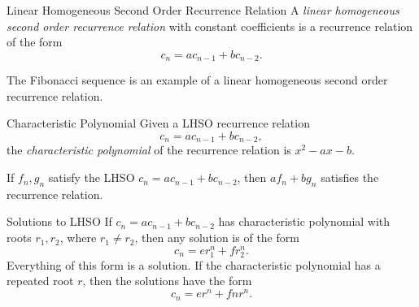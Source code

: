 \documentclass[class=article, crop=false]{standalone}
\begin{document}
  \begin{definition}{Linear Homogeneous Second Order Recurrence Relation}
    A \emph{linear homogeneous second order recurrence relation} with constant coefficients is a recurrence relation of the form
    \[
      c_n = ac_{n-1} + bc_{n-2} \tag{$a, b\in \R$}.
    \]
  \end{definition}
  \begin{example}{}
    The Fibonacci sequence is an example of a linear homogeneous second order recurrence relation.
  \end{example}
  \begin{definition}{Characteristic Polynomial}
    Given a LHSO recurrence relation
    \[
      c_n = ac_{n-1} + bc_{n-2} \tag{$a, b\in \R$},
    \]
    the \emph{characteristic polynomial} of the recurrence relation is $x^2 - ax - b$.
  \end{definition}
  \begin{note}{}
    If $f_n, g_n$ satisfy the LHSO $c_n = ac_{n-1} + bc_{n-2}$, then $af_n + bg_n$ satisfies the recurrence relation.
  \end{note}
  \begin{theorem}{Solutions to LHSO}
    If $c_n = ac_{n-1} + bc_{n-2}$ has characteristic polynomial with roots $r_1,r_2$, where $r_1\neq r_2$, then any solution is of the form
    \[
      c_n = er_1^n + fr_2^n. \tag{$e,f\in\R$}
    \]
    Everything of this form is a solution. If the characteristic polynomial has a repeated root $r$, then the solutions have the form
    \[
      c_n = er^n + fnr^n. \tag{$e,f\in\R$}
    \]
  \end{theorem}
\end{document}
